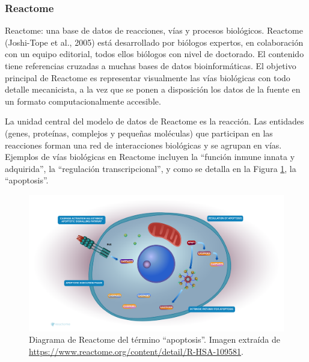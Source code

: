 \documentclass[12pt,twoside]{reedthesis}
\begin{document}
\hypertarget{reactome}{%
\subsubsection{Reactome}\label{reactome}}

Reactome: una base de datos de reacciones, vías y procesos biológicos. Reactome (Joshi-Tope et al., 2005) está desarrollado por biólogos expertos, en colaboración con un equipo editorial, todos ellos biólogos con nivel de doctorado. El contenido tiene referencias cruzadas a muchas bases de datos bioinformáticas. El objetivo principal de Reactome es representar visualmente las vías biológicas con todo detalle mecanicista, a la vez que se ponen a disposición los datos de la fuente en un formato computacionalmente accesible.

\par

La unidad central del modelo de datos de Reactome es la reacción. Las entidades (genes, proteínas, complejos y pequeñas moléculas) que participan en las reacciones forman una red de interacciones biológicas y se agrupan en vías. Ejemplos de vías biológicas en Reactome incluyen la ``función inmune innata y adquirida'', la ``regulación transcripcional'', y como se detalla en la Figura \ref{fig:reactomeApoptPathw}, la ``apoptosis''.
\begin{figure}

{\centering \includegraphics[width=1\linewidth]{images/reactome_apoptosis} 

}

\caption{Diagrama de Reactome del término ``apoptosis''. Imagen extraída de \url{https://www.reactome.org/content/detail/R-HSA-109581}.}\label{fig:reactomeApoptPathw}
\end{figure}


\par
\end{document}
